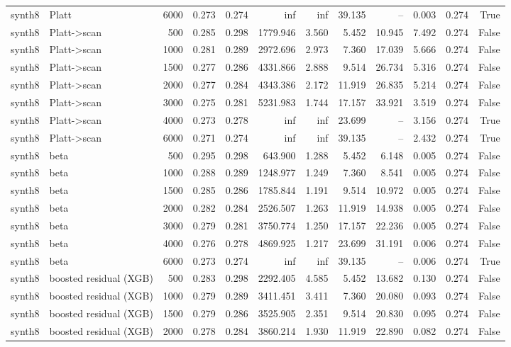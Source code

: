 \begin{tabular}{llrrrrrrrrrr}
synth8 & Platt & 6000 & 0.273 & 0.274 & inf & inf & 39.135 & -- & 0.003 & 0.274 & True \\
synth8 & Platt->scan & 500 & 0.285 & 0.298 & 1779.946 & 3.560 & 5.452 & 10.945 & 7.492 & 0.274 & False \\
synth8 & Platt->scan & 1000 & 0.281 & 0.289 & 2972.696 & 2.973 & 7.360 & 17.039 & 5.666 & 0.274 & False \\
synth8 & Platt->scan & 1500 & 0.277 & 0.286 & 4331.866 & 2.888 & 9.514 & 26.734 & 5.316 & 0.274 & False \\
synth8 & Platt->scan & 2000 & 0.277 & 0.284 & 4343.386 & 2.172 & 11.919 & 26.835 & 5.214 & 0.274 & False \\
synth8 & Platt->scan & 3000 & 0.275 & 0.281 & 5231.983 & 1.744 & 17.157 & 33.921 & 3.519 & 0.274 & False \\
synth8 & Platt->scan & 4000 & 0.273 & 0.278 & inf & inf & 23.699 & -- & 3.156 & 0.274 & True \\
synth8 & Platt->scan & 6000 & 0.271 & 0.274 & inf & inf & 39.135 & -- & 2.432 & 0.274 & True \\
synth8 & beta & 500 & 0.295 & 0.298 & 643.900 & 1.288 & 5.452 & 6.148 & 0.005 & 0.274 & False \\
synth8 & beta & 1000 & 0.288 & 0.289 & 1248.977 & 1.249 & 7.360 & 8.541 & 0.005 & 0.274 & False \\
synth8 & beta & 1500 & 0.285 & 0.286 & 1785.844 & 1.191 & 9.514 & 10.972 & 0.005 & 0.274 & False \\
synth8 & beta & 2000 & 0.282 & 0.284 & 2526.507 & 1.263 & 11.919 & 14.938 & 0.005 & 0.274 & False \\
synth8 & beta & 3000 & 0.279 & 0.281 & 3750.774 & 1.250 & 17.157 & 22.236 & 0.005 & 0.274 & False \\
synth8 & beta & 4000 & 0.276 & 0.278 & 4869.925 & 1.217 & 23.699 & 31.191 & 0.006 & 0.274 & False \\
synth8 & beta & 6000 & 0.273 & 0.274 & inf & inf & 39.135 & -- & 0.006 & 0.274 & True \\
synth8 & boosted residual (XGB) & 500 & 0.283 & 0.298 & 2292.405 & 4.585 & 5.452 & 13.682 & 0.130 & 0.274 & False \\
synth8 & boosted residual (XGB) & 1000 & 0.279 & 0.289 & 3411.451 & 3.411 & 7.360 & 20.080 & 0.093 & 0.274 & False \\
synth8 & boosted residual (XGB) & 1500 & 0.279 & 0.286 & 3525.905 & 2.351 & 9.514 & 20.830 & 0.095 & 0.274 & False \\
synth8 & boosted residual (XGB) & 2000 & 0.278 & 0.284 & 3860.214 & 1.930 & 11.919 & 22.890 & 0.082 & 0.274 & False \\

\end{tabular}
